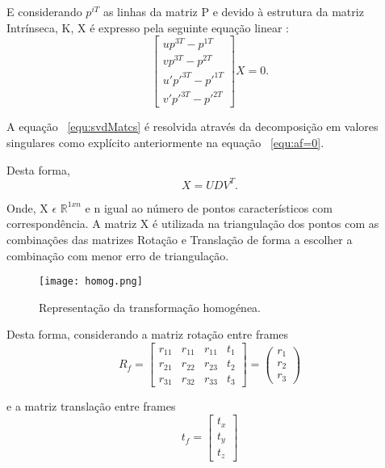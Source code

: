 E considerando $p^{iT}$ as linhas da matriz P e devido à estrutura da matriz Intrínseca, K, X é expresso pela seguinte equação linear :  \begin{equation}\label{equ:svdMatcs} 
\left[ \begin{array}{cccc}
up^{3T} - p^{1T} \\
vp^{3T} - p^{2T} \\
u'p'^{3T} - p'^{1T} \\
v'p'^{3T} - p'^{2T} 
\end{array} \right] X = 0 .
\end{equation}

A equação ~\ref{equ:svdMatcs} é resolvida através da decomposição em valores singulares como explícito anteriormente na equação ~\ref{equ:af=0}.

Desta forma, \[ X = UDV^T. \] 

Onde, X $\epsilon$ $\mathbb{R}^{1xn}$ e n igual ao número de pontos característicos com correspondência.
A matriz X é utilizada na triangulação dos pontos com as combinações das matrizes Rotação e Translação de forma a escolher a combinação com menor erro de triangulação.

\begin{figure}[h!] %
	\begin{center}
		\leavevmode		
		\texttt{[image: homog.png]}
		\caption{Representação da transformação homogénea.}
		\label{fig:homog}
	\end{center}
\end{figure}

\vspace{5mm}  %

Desta forma, considerando a matriz rotação entre frames \[  R_f = \left[ \begin{array}{cccc}
r_{11} & r_{11} & r_{11} & t_1 \\ 
r_{21} & r_{22} & r_{23} & t_2 \\ 
r_{31} & r_{32} & r_{33} & t_3 
\end{array} \right] = \left(\begin{array}{ccc}
r_1 \\ r_2 \\ r_3
\end{array}\right)\]

e a matriz translação entre frames \[ t_f = \left[ \begin{array}{ccc}
t_x \\ t_y \\ t_z
\end{array}\right]\]

